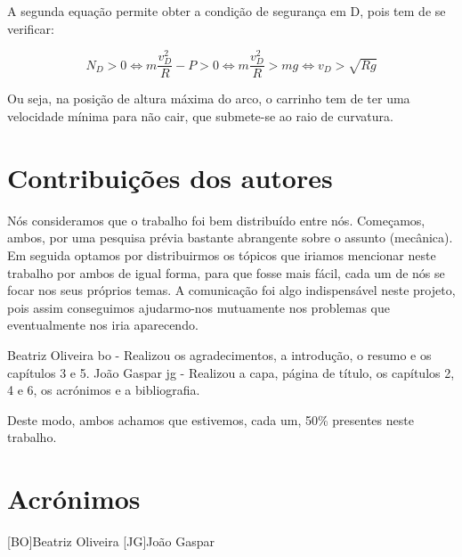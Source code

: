 \documentclass[a4paper,11pt,oneside]{report}
\begin{document}
A segunda equação permite obter a condição de segurança em D, pois tem de se verificar: 

\[
N_D > 0 \Leftrightarrow m\frac{v_{D}^{2}}{R} - P > 0 \Leftrightarrow m\frac{v_{D}^{2}}{R} > mg \Leftrightarrow v_D > \sqrt{Rg}
\]

Ou seja, na posição de altura máxima do arco, o carrinho tem de ter uma velocidade 
mínima para não cair, que submete-se ao raio de curvatura.

\chapter*{Contribuições dos autores}
Nós consideramos que o trabalho foi bem distribuído entre nós. Começamos, ambos, 
por uma pesquisa prévia bastante abrangente sobre o assunto (mecânica). 
Em seguida optamos por distribuirmos os tópicos que iriamos mencionar neste trabalho 
por ambos de igual forma, para que fosse mais fácil, cada um de nós se focar nos seus 
próprios temas. A comunicação foi algo indispensável neste projeto, pois assim 
conseguimos ajudarmo-nos mutuamente nos problemas que eventualmente nos iria aparecendo. 

Beatriz Oliveira \ac{bo} - Realizou os agradecimentos, a introdução, o resumo e os capítulos 3 e 5.
João Gaspar \ac{jg} - Realizou a capa, página de título, os capítulos 2, 4 e 6, os acrónimos e a bibliografia.

Deste modo, ambos achamos que estivemos, cada um, 50\% presentes neste trabalho.


\chapter*{Acrónimos}
\begin{acronym}
[BO]{Beatriz Oliveira}
[JG]{João Gaspar}
\end{acronym}


\printbibliography
\end{document}
